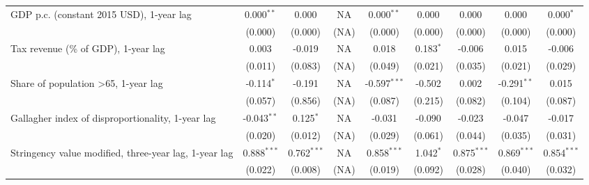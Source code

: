 \begin{table}[htbp]
\begin{tabular}{lcccccccc}
      GDP p.c. (constant 2015 USD), 1-year lag                            & 0.000$^{**}$  & 0.000                     & NA           & 0.000$^{**}$   & 0.000            & 0.000           & 0.000           & 0.000$^{*}$\\   
                                                                          & (0.000)       & (0.000)                   & (NA)         & (0.000)        & (0.000)          & (0.000)         & (0.000)         & (0.000)\\   
      Tax revenue (\% of GDP), 1-year lag                                 & 0.003         & -0.019                    & NA           & 0.018          & 0.183$^{*}$      & -0.006          & 0.015           & -0.006\\   
                                                                          & (0.011)       & (0.083)                   & (NA)         & (0.049)        & (0.021)          & (0.035)         & (0.021)         & (0.029)\\   
      Share of population >65, 1-year lag                                 & -0.114$^{*}$  & -0.191                    & NA           & -0.597$^{***}$ & -0.502           & 0.002           & -0.291$^{**}$   & 0.015\\   
                                                                          & (0.057)       & (0.856)                   & (NA)         & (0.087)        & (0.215)          & (0.082)         & (0.104)         & (0.087)\\   
      Gallagher index of disproportionality, 1-year lag                   & -0.043$^{**}$ & 0.125$^{*}$               & NA           & -0.031         & -0.090           & -0.023          & -0.047          & -0.017\\   
                                                                          & (0.020)       & (0.012)                   & (NA)         & (0.029)        & (0.061)          & (0.044)         & (0.035)         & (0.031)\\   
      Stringency value modified, three-year lag, 1-year lag               & 0.888$^{***}$ & 0.762$^{***}$             & NA           & 0.858$^{***}$  & 1.042$^{*}$      & 0.875$^{***}$   & 0.869$^{***}$   & 0.854$^{***}$\\   
                                                                          & (0.022)       & (0.008)                   & (NA)         & (0.019)        & (0.092)          & (0.028)         & (0.040)         & (0.032)\\   

\end{tabular}
\end{table}
